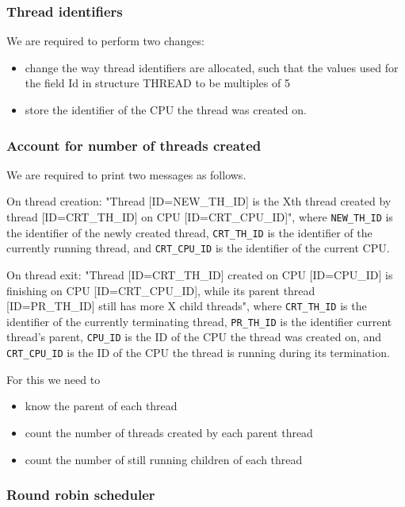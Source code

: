 \subsubsection{Thread identifiers}
We are required to perform two changes:
\begin{itemize}
    \item change the way thread identifiers are allocated, such that the values used for the field Id in structure THREAD to be multiples of 5
    \item store the identifier of the CPU the thread was created on.
\end{itemize}

\subsubsection{Account for number of threads created}

We are required to print two messages as follows. 

On thread creation:  "Thread [ID=NEW\_TH\_ID] is the Xth thread created by thread [ID=CRT\_TH\_ID] on CPU [ID=CRT\_CPU\_ID]", where \lstinline|NEW_TH_ID| is the identifier of the newly created thread, \lstinline|CRT_TH_ID| is the identifier of the currently running thread, and \lstinline|CRT_CPU_ID| is the identifier of the current CPU. 

On thread exit: "Thread [ID=CRT\_TH\_ID] created on CPU [ID=CPU\_ID] is finishing on CPU [ID=CRT\_CPU\_ID], while its parent thread [ID=PR\_TH\_ID] still has more X child threads", where \lstinline|CRT_TH_ID| is the identifier of the currently terminating thread, \lstinline|PR_TH_ID| is the identifier current thread's parent, \lstinline|CPU_ID| is the ID of the CPU the thread was created on, and \lstinline|CRT_CPU_ID| is the ID of the CPU the thread is running during its termination.

For this we need to
\begin{itemize}
    \item know the parent of each thread
    \item count the number of threads created by each parent thread
    \item count the number of still running children of each thread
\end{itemize}


\subsubsection{ Round robin scheduler}

